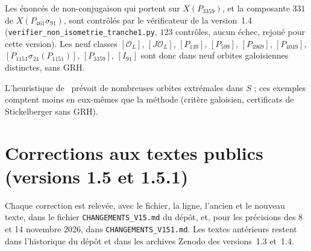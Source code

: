 \documentclass[11pt,a4paper]{amsart}
\theoremstyle{plain}
\theoremstyle{definition}
\newcommand{\OO}{\mathcal{O}}
\newcommand{\XA}{X(P_{3359})}
\newcommand{\XB}{X(P_{461}\sigma_{91})}
\begin{document}
Les énoncés de non-conjugaison qui portent sur $\XA$, et la composante $331$ de $\XB$, sont contrôlés par le vérificateur de la version~1.4 (\nolinkurl{verifier_non_isometrie_tranche1.py}, $123$ contrôles, aucun échec, rejoué pour cette version). Les neuf classes $[\OO_L]$, $[J\OO_L]$, $[P_{139}]$, $[P_{599}]$, $[P_{4969}]$, $[P_{4049}]$, $[P_{1151}\sigma_{24}(P_{1151})]$, $[P_{3359}]$, $[I_{91}]$ sont donc dans neuf orbites galoisiennes distinctes, sans GRH.

L'heuristique de~\cite[Q2]{Gau26} prévoit de nombreuses orbites extrémales dans $S$ ; ces exemples comptent moins en eux-mêmes que la méthode (critère galoisien, certificats de Stickelberger sans GRH).

\section{Corrections aux textes publics (versions 1.5 et 1.5.1)}\label{sec:corrections}
Chaque correction est relevée, avec le fichier, la ligne, l'ancien et le nouveau texte, dans le fichier \texttt{CHANGEMENTS\_V15.md} du dépôt, et, pour les précisions des 8 et 14 novembre 2026, dans \texttt{CHANGEMENTS\_V151.md}. Les textes antérieurs restent dans l'historique du dépôt et dans les archives Zenodo des versions~1.3 et~1.4.
\end{document}
